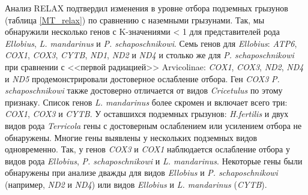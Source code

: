 Анализ RELAX подтвердил изменения в уровне отбора подземных грызунов (таблица \ref{MT_relax}) по сравнению с наземными грызунами. Так, мы обнаружили несколько генов с K-значениями < 1 для представителей рода \textit{Ellobius}, \textit{L. mandarinus} и \textit{P. schaposchnikowi}. Семь генов для \textit{Ellobius}: \textit{ATP6}, \textit{COX1}, \textit{COX3}, \textit{CYTB}, \textit{ND1}, \textit{ND2} и \textit{ND4} и столько же для \textit{P. schaposchnikowi} при сравнении с <<первой радиацией>> Arvicolinae: \textit{COX1}, \textit{COX3}, \textit{ND2}, \textit{ND4} и \textit{ND5} продемонстрировали достоверное ослабление отбора. Ген \textit{COX3} \textit{P. schaposchnikowi} также достоверно отличается от видов \textit{Cricetulus} по этому признаку. Список генов \textit{L. mandarinus} более скромен и включает всего три: \textit{COX1}, \textit{COX3} и \textit{CYTB}. У оставшихся подземных грызунов: \textit{H.fertilis} и двух видов рода \textit{Terricola} гены с достоверным ослаблением или усилением отбора не обнаружены.
Многие гены выявлены у нескольких подземных видов одновременно. Так, у генов \textit{COX3} и \textit{COX1} наблюдается ослабление отбора у видов рода \textit{Ellobius}, \textit{P. schaposchnikowi} и \textit{L. mandarinus}. Некоторые гены были обнаружены при анализе дважды для видов \textit{Ellobius} и \textit{P. schaposchnikowi} (например, \textit{ND2} и \textit{ND4}) или видов \textit{Ellobius} и \textit{L. mandarinus} (\textit{CYTB}).

